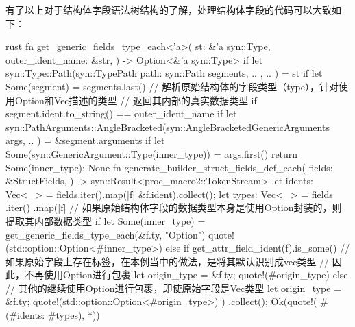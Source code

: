\begin{code-block}{json}
{{{{{{{                                                        PathSegment {
                                                            ident: Ident {
                                                                ident: "String",
                                                                span: #0 bytes(1778..1784),
                                                            },
                                                            arguments: None,
                                                        },
                                                    ],
                                                },
                                            },
                                        ),
                                    ),
                                ],
                                gt_token: Gt,
                            },
                        ),
                    },
                ],
            },
        },
    ),
}
\end{code-block}

有了以上对于结构体字段语法树结构的了解，处理结构体字段的代码可以大致如下：
\begin{code-block}{rust}
fn get_generic_fields_type_each<'a>(
    st: &'a syn::Type,
    outer_ident_name: &str,
) -> Option<&'a syn::Type> {
    if let syn::Type::Path(syn::TypePath {
        path: syn::Path { segments, .. },
        ..
    }) = st
    {
        if let Some(segment) = segments.last() {
            // 解析原始结构体的字段类型（type），针对使用Option和Vec描述的类型
            // 返回其内部的真实数据类型
            if segment.ident.to_string() == outer_ident_name {
                if let syn::PathArguments::AngleBracketed(syn::AngleBracketedGenericArguments {
                    args,
                    ..
                }) = &segment.arguments
                {
                    if let Some(syn::GenericArgument::Type(inner_type)) = args.first() {
                        return Some(inner_type);
                    }
                }
            }
        }
    }
    None
}
fn generate_builder_struct_fields_def_each(
    fields: &StructFields,
) -> syn::Result<proc_macro2::TokenStream> {
    let idents: Vec<_> = fields.iter().map(|f| &f.ident).collect();
    let types: Vec<_> = fields
        .iter()
        .map(|f| {
            // 如果原始结构体字段的数据类型本身是使用Option封装的，则提取其内部数据类型
            if let Some(inner_type) = get_generic_fields_type_each(&f.ty, "Option") {
                quote!(std::option::Option<#inner_type>)
            } else if get_attr_field_ident(f).is_some() {
                // 如果原始字段上存在标签，在本例当中的做法，是将其默认识别成vec类型
                // 因此，不再使用Option进行包裹
                let origin_type = &f.ty;
                quote!(#origin_type)
            } else {
                // 其他的继续使用Option进行包裹，即使原始字段是Vec类型
                let origin_type = &f.ty;
                quote!(std::option::Option<#origin_type>)
            }
        })
        .collect();
    Ok(quote!( #(#idents: #types), *))
}
\end{code-block}

